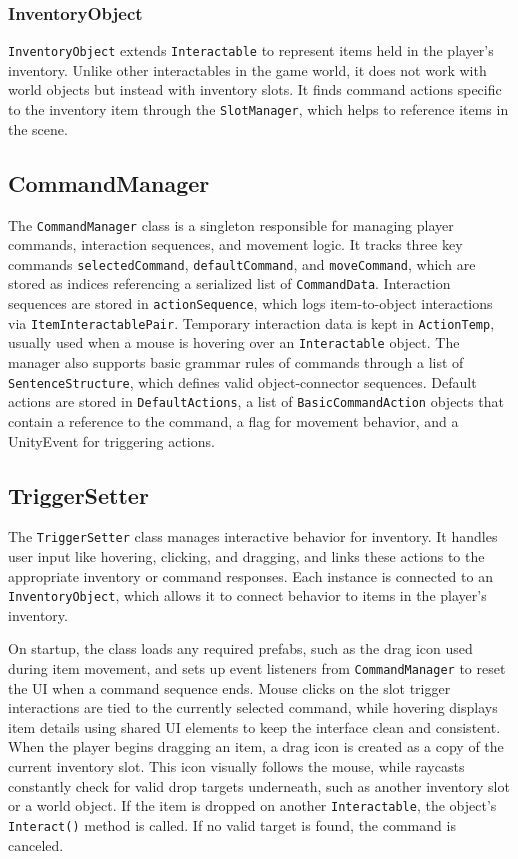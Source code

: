 \subsubsection{InventoryObject}
\verb|InventoryObject| extends \verb|Interactable| to represent items held in the player’s inventory. Unlike other interactables in the game world, it does not work with world objects but instead with inventory slots. It finds command actions specific to the inventory item through the \verb|SlotManager|, which helps to reference items in the scene. 

\subsection{CommandManager}
The \verb|CommandManager| class is a singleton responsible for managing player commands, interaction sequences, and movement logic. It tracks three key commands \verb|selectedCommand|, \verb|defaultCommand|, and \verb|moveCommand|, which are stored as indices referencing a serialized list of \verb|CommandData|. Interaction sequences are stored in \verb|actionSequence|, which logs item-to-object interactions via \verb|ItemInteractablePair|. Temporary interaction data is kept in \verb|ActionTemp|, usually used when a mouse is hovering over an \verb|Interactable| object. The manager also supports basic grammar rules of commands through a list of \verb|SentenceStructure|, which defines valid object-connector sequences. Default actions are stored in \verb|DefaultActions|, a list of \verb|BasicCommandAction| objects that contain a reference to the command, a flag for movement behavior, and a UnityEvent for triggering actions.
 

\subsection{TriggerSetter}
The \verb|TriggerSetter| class manages interactive behavior for inventory. It handles user input like hovering, clicking, and dragging, and links these actions to the appropriate inventory or command responses. Each instance is connected to an \verb|InventoryObject|, which allows it to connect behavior to items in the player's inventory.

On startup, the class loads any required prefabs, such as the drag icon used during item movement, and sets up event listeners from \verb|CommandManager| to reset the UI when a command sequence ends. Mouse clicks on the slot trigger interactions are tied to the currently selected command, while hovering displays item details using shared UI elements to keep the interface clean and consistent. When the player begins dragging an item, a drag icon is created as a copy of the current inventory slot. This icon visually follows the mouse, while raycasts constantly check for valid drop targets underneath, such as another inventory slot or a world object. If the item is dropped on another \verb|Interactable|, the object’s \verb|Interact()| method is called. If no valid target is found, the command is canceled.

